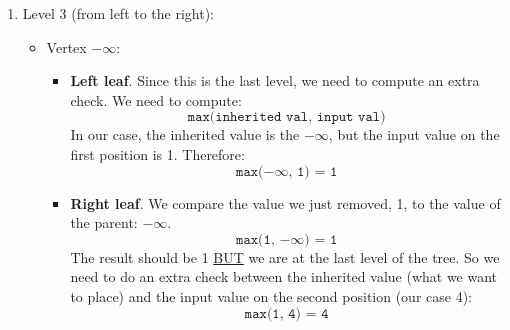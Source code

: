 \begin{itemize}
\begin{itemize}
\begin{enumerate}
\begin{examplebox}
\begin{enumerate}
\begin{center}
                    \end{center}
                    \item Level 3 (from left to the right):
                    \begin{itemize}
                        \item Vertex $-\infty$:
                        \begin{itemize}
                            \item \textbf{Left leaf}. Since this is the last level, we need to compute an extra check. We need to compute:
                            \begin{equation}
                                \texttt{max(inherited val, input val)}
                            \end{equation}\label{eq: down-sweep last level}
                            In our case, the inherited value is the $-\infty$, but the input value on the first position is 1. Therefore:
                            \begin{equation*}
                                \texttt{max($-\infty$, 1) = 1}
                            \end{equation*}
                            \item \textbf{Right leaf}. We compare the value we just removed, 1, to the value of the parent: $-\infty$.
                            \begin{equation*}
                                \texttt{max(1, $-\infty$) = 1}
                            \end{equation*}
                            The result should be 1 \underline{BUT} we are at the last level of the tree. So we need to do an extra check between the inherited value (what we want to place) and the input value on the second position (our case 4):
                            \begin{equation*}
                                \texttt{max(1, 4) = 4}
                            \end{equation*}

\end{itemize}
\end{itemize}
\end{enumerate}
\end{examplebox}
\end{enumerate}
\end{itemize}
\end{itemize}
